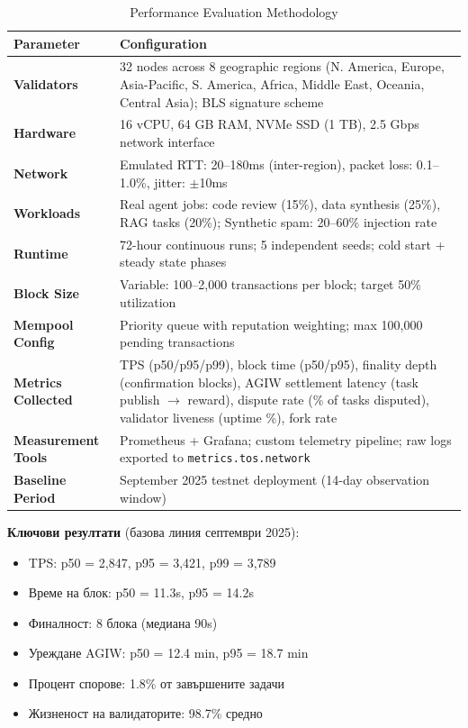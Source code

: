 \documentclass[11pt]{article}
\begin{document}
\begin{table}[H]
\centering
\caption{Performance Evaluation Methodology}
\label{tab:evaluation-methodology}
\begin{tabular}{@{}p{}p{}@{}}
\toprule
\textbf{Parameter} & \textbf{Configuration} \\ \midrule
\textbf{Validators} & 32 nodes across 8 geographic regions (N. America, Europe, Asia-Pacific, S. America, Africa, Middle East, Oceania, Central Asia); BLS signature scheme \\
\textbf{Hardware} & 16 vCPU, 64 GB RAM, NVMe SSD (1 TB), 2.5 Gbps network interface \\
\textbf{Network} & Emulated RTT: 20--180ms (inter-region), packet loss: 0.1--1.0\%, jitter: $\pm$10ms \\
\textbf{Workloads} & Real agent jobs: code review (15\%), data synthesis (25\%), RAG tasks (20\%); Synthetic spam: 20--60\% injection rate \\
\textbf{Runtime} & 72-hour continuous runs; 5 independent seeds; cold start + steady state phases \\
\textbf{Block Size} & Variable: 100--2,000 transactions per block; target 50\% utilization \\
\textbf{Mempool Config} & Priority queue with reputation weighting; max 100,000 pending transactions \\
\textbf{Metrics Collected} & TPS (p50/p95/p99), block time (p50/p95), finality depth (confirmation blocks), AGIW settlement latency (task publish $\rightarrow$ reward), dispute rate (\% of tasks disputed), validator liveness (uptime \%), fork rate \\
\textbf{Measurement Tools} & Prometheus + Grafana; custom telemetry pipeline; raw logs exported to \texttt{metrics.tos.network} \\
\textbf{Baseline Period} & September 2025 testnet deployment (14-day observation window) \\
\bottomrule
\end{tabular}
\end{table}

\textbf{Ключови резултати} (базова линия септември 2025):
\begin{itemize}[noitemsep]
  \item TPS: p50 = 2,847, p95 = 3,421, p99 = 3,789
  \item Време на блок: p50 = 11.3s, p95 = 14.2s
  \item Финалност: 8 блока (медиана 90s)
  \item Уреждане AGIW: p50 = 12.4 min, p95 = 18.7 min
  \item Процент спорове: 1.8\% от завършените задачи
  \item Жизненост на валидаторите: 98.7\% средно
\end{itemize}
\end{document}
